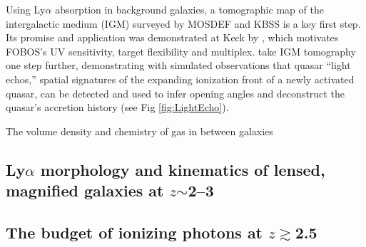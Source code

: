 Using Ly$\alpha$ absorption in background galaxies, a tomographic map of the intergalactic medium (IGM) surveyed by MOSDEF and KBSS is a key first step.  Its promise and application was demonstrated at Keck by \citet{lee14}, which motivates FOBOS's UV sensitivity, target flexibility and multiplex.  \citet{2018arXiv181005156S} take IGM tomography one step further, demonstrating with simulated observations that quasar ``light echos,'' spatial signatures of the expanding ionization front of a newly activated quasar, can be detected and used to infer opening angles and deconstruct the quasar's accretion history (see Fig \ref{fig:LightEcho}).  

The volume density and chemistry of gas in between galaxies
\noindent{}


\subsection{Ly$\alpha$ morphology and kinematics of lensed, magnified
galaxies at $z$$\sim$2--3}

\noindent{}

\subsection{The budget of ionizing photons at $z$$\gtrsim$2.5}

\noindent{}


%
%
%
%

